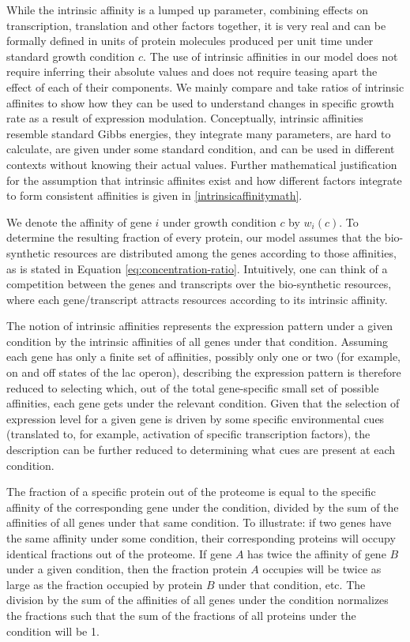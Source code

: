 \documentclass{article}
\begin{document}
While the intrinsic affinity is a lumped up parameter, combining effects on transcription, translation and other factors together, it is very real and can be formally defined in units of protein molecules produced per unit time under standard growth condition $c$.
The use of intrinsic affinities in our model does not require inferring their absolute values and does not require teasing apart the effect of each of their components.
We mainly compare and take ratios of intrinsic affinites to show how they can be used to understand changes in specific growth rate as a result of expression modulation.
Conceptually, intrinsic affinities resemble standard Gibbs energies, they integrate many parameters, are hard to calculate, are given under some standard condition, and can be used in different contexts without knowing their actual values.
Further mathematical justification for the assumption that intrinsic affinites exist and how different factors integrate to form consistent affinities is given in \ref{intrinsicaffinitymath}.

We denote the affinity of gene $i$ under growth condition $c$ by $w_i(c)$.
To determine the resulting fraction of every protein, our model assumes that the bio-synthetic resources are distributed among the genes according to those affinities, as is stated in Equation \ref{eq:concentration-ratio}.
Intuitively, one can think of a competition between the genes and transcripts over the bio-synthetic resources, where each gene/transcript attracts resources according to its intrinsic affinity.

The notion of intrinsic affinities represents the expression pattern under a given condition by the intrinsic affinities of all genes under that condition.
Assuming each gene has only a finite set of affinities, possibly only one or two (for example, on and off states of the lac operon), describing the expression pattern is therefore reduced to selecting which, out of the total gene-specific small set of possible affinities, each gene gets under the relevant condition.
Given that the selection of expression level for a given gene is driven by some specific environmental cues (translated to, for example, activation of specific transcription factors), the description can be further reduced to determining what cues are present at each condition.

The fraction of a specific protein out of the proteome is equal to the specific affinity of the corresponding gene under the condition, divided by the sum of the affinities of all genes under that same condition.
To illustrate: if two genes have the same affinity under some condition, their corresponding proteins will occupy identical fractions out of the proteome.
If gene $A$ has twice the affinity of gene $B$ under a given condition, then the fraction protein  $A$ occupies will be twice as large as the fraction occupied by protein $B$ under that condition, etc.
The division by the sum of the affinities of all genes under the condition normalizes the fractions such that the sum of the fractions of all proteins under the condition will be 1.
\end{document}
